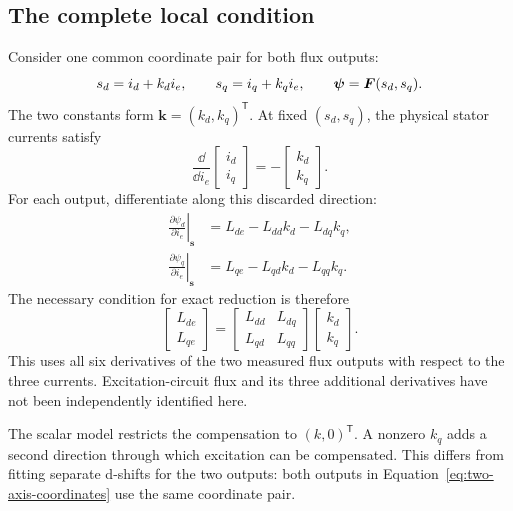 \subsection{The complete local condition}
Consider one common coordinate pair for both flux outputs:
\begin{equation}\label{eq:two-axis-coordinates}
s_d=i_d+k_di_e,\qquad s_q=i_q+k_qi_e,
\qquad \bm\psi=\bm F(s_d,s_q).
\end{equation}
The two constants form $\bm k=(k_d,k_q)^{\mathsf T}$. At fixed $(s_d,s_q)$, the physical stator currents satisfy
\begin{equation}
\frac{\dd}{\dd i_e}\begin{bmatrix}i_d\\i_q\end{bmatrix}
=-\begin{bmatrix}k_d\\k_q\end{bmatrix}.
\end{equation}
For each output, differentiate along this discarded direction:
\begin{align}
\left.\frac{\partial\psi_d}{\partial i_e}\right|_{\bm s}
&=L_{de}-L_{dd}k_d-L_{dq}k_q,\\
\left.\frac{\partial\psi_q}{\partial i_e}\right|_{\bm s}
&=L_{qe}-L_{qd}k_d-L_{qq}k_q.
\end{align}
The necessary condition for exact reduction is therefore
\begin{equation}\label{eq:two-axis-condition}
\boxed{
\begin{bmatrix}L_{de}\\L_{qe}\end{bmatrix}
=
\begin{bmatrix}L_{dd}&L_{dq}\\L_{qd}&L_{qq}\end{bmatrix}
\begin{bmatrix}k_d\\k_q\end{bmatrix}.}
\end{equation}
This uses all six derivatives of the two measured flux outputs with respect to the three currents. Excitation-circuit flux and its three additional derivatives have not been independently identified here.

The scalar model restricts the compensation to $(k,0)^{\mathsf T}$. A nonzero $k_q$ adds a second direction through which excitation can be compensated. This differs from fitting separate d-shifts for the two outputs: both outputs in Equation~\eqref{eq:two-axis-coordinates} use the same coordinate pair.

